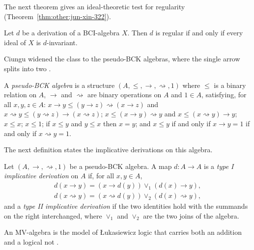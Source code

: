 The next theorem gives an ideal-theoretic test for regularity
(Theorem~\ref{thm:other:jun-xin-322}).

\begin{theorem}\label{thm:other:jun-xin-322}
Let $d$ be a derivation of a BCI-algebra $X$. Then $d$ is regular if and
only if every ideal of $X$ is $d$-invariant.
\end{theorem}

Ciungu widened the class to the pseudo-BCK algebras, where the single
arrow splits into two
\cite[Definition~2.1, p.~2]{Ciungu2021}.

\begin{definition}\label{def:other:pseudo-bck}
A \emph{pseudo-BCK algebra} is a structure $(A, \le, \to, \rightsquigarrow, 1)$
where $\le$ is a binary relation on $A$, $\to$ and $\rightsquigarrow$ are
binary operations on $A$ and $1 \in A$, satisfying, for all $x, y, z \in A$:
$x \to y \le (y \to z) \rightsquigarrow (x \to z)$ and
$x \rightsquigarrow y \le (y \rightsquigarrow z) \to (x \rightsquigarrow z)$;
$x \le (x \to y) \rightsquigarrow y$ and
$x \le (x \rightsquigarrow y) \to y$; $x \le x$; $x \le 1$; if $x \le y$
and $y \le x$ then $x = y$; and $x \le y$ if and only if $x \to y = 1$ if
and only if $x \rightsquigarrow y = 1$.
\end{definition}

The next definition states the implicative derivations on this algebra.

\begin{definition}\label{def:other:implicative-derivation}
Let $(A, \to, \rightsquigarrow, 1)$ be a pseudo-BCK algebra. A map
$d \colon A \to A$ is a \emph{type I implicative derivation} on $A$ if,
for all $x, y \in A$,
\begin{gather*}
d(x \to y) = (x \to d(y)) \vee_1 (d(x) \to y),\\
d(x \rightsquigarrow y) = (x \rightsquigarrow d(y)) \vee_2 (d(x) \rightsquigarrow y),
\end{gather*}
and a \emph{type II implicative derivation} if the two identities hold
with the summands on the right interchanged, where $\vee_1$ and
$\vee_2$ are the two joins of the algebra.
\end{definition}

An MV-algebra is the model of Łukasiewicz logic that carries both an
addition and a logical not \cite[p.~261]{WangSheQian2019}.

